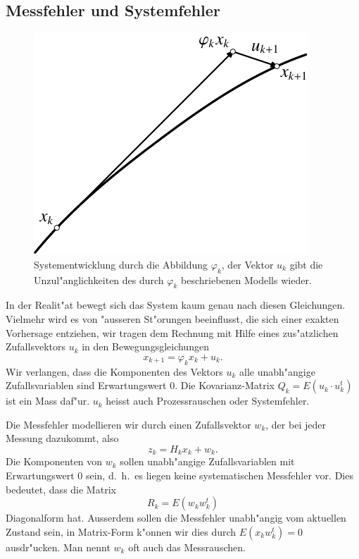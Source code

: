 \subsection{Messfehler und Systemfehler}
\begin{figure}
\centering
\includegraphics{images/filter-1.pdf}
\caption{Systementwicklung durch die Abbildung $\varphi_k$, der Vektor $u_k$
gibt die Unzul"anglichkeiten des durch $\varphi_k$ beschriebenen Modells
wieder.
\label{filter-systementwicklung}}
\end{figure}
In der Realit"at bewegt sich das System kaum genau nach diesen Gleichungen.
Vielmehr wird es von "ausseren St"orungen beeinflusst, die sich einer
exakten Vorhersage entziehen, wir tragen dem Rechnung mit Hilfe eines
zus"atzlichen Zufallsvektors $u_k$ in den Bewegungsgleichungen
\[
x_{k+1}=\varphi_kx_k+ u_k.
\]
Wir verlangen, dass die Komponenten des Vektors $u_k$ alle unabh"angige
Zufallsvariablen sind Erwartungswert 0.
Die Kovarianz-Matrix $Q_k=E(u_k\cdot u_k^t)$ ist
ein Mass daf"ur.
$u_k$ heisst auch Prozessrauschen oder Systemfehler.

Die Messfehler modellieren wir durch einen
Zufallsvektor $w_k$, der bei jeder Messung dazukommt, also
\[
z_k=H_kx_k+w_k.
\]
Die Komponenten von $w_k$ sollen unabh"angige Zufallsvariablen mit
Erwartungswert $0$ sein, d.~h.~es liegen keine systematischen Messfehler
vor.
Dies bedeutet, dass die Matrix
\[
R_k=E(w_kw_k^t)
\]
Diagonalform hat.
Ausserdem sollen die Messfehler unabh"angig vom aktuellen Zustand
sein, in Matrix-Form k"onnen wir dies durch $E(x_kw_k^t)=0$ ausdr"ucken.
Man nennt $w_k$ oft auch das Messrauschen.

